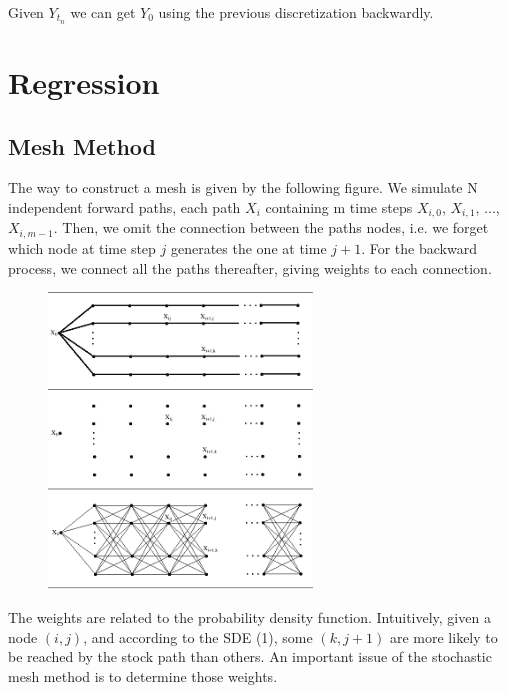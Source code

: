 \documentclass[english,11pt,openany]{article}
\theoremstyle{definition}
\newcommand\blankpage{%
	\null
	\thispagestyle{empty}%
	\addtocounter{page}{-1}%
	\newpage}
\theoremstyle{plain}
\theoremstyle{definition}
\begin{document}
	Given $Y_{t_n}$ we can get $Y_0$ using the previous discretization backwardly. 
	
	
	
	\blankpage
	
	
	
	\newpage
	\section{Regression}
	
	\subsection{Mesh Method}
	
	The way to construct a mesh is given by the following figure. We simulate N independent forward paths, each path $X_i$ containing m time steps $X_{i,0}$, $X_{i,1}$, ..., $X_{i,m-1}$. Then, we omit the connection between the paths nodes, i.e. we forget which node at time step $j$ generates the one at time $j+1$. 
	For the backward process, we connect all the paths thereafter, giving weights to each connection.   
	
	
	\begin{figure}[!htb]
		\begin{center}
			
			\includegraphics[width=7cm]{mesh_figure.png} 
			
		\end{center}
	\end{figure}
	\newpage
	
	
	The weights are related to the probability density function. Intuitively, given a node $(i,j)$, and according to the SDE (1), some $(k,j+1)$ are more likely to be reached by the stock path than others. An important issue of the stochastic mesh method is to determine those weights. 
	
\end{document}
